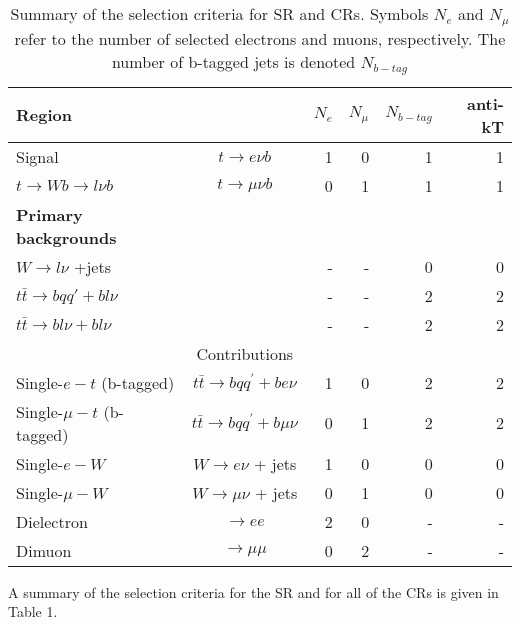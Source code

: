 \begin{table}[h!]
  \begin{center}
    \label{tab:table1}
    \begin{tabular}{lcrrrr} %
      \textbf{Region} & & \textbf{$N_{e}$}&\textbf{$N_{\mu}$}&\textbf{$N_{b-tag}$} & anti-kT\\ \hline
           Signal & $t \rightarrow e\nu b$ & 1 & 0 & 1 & 1\\
           $t \rightarrow Wb \rightarrow {l}\nu b$ & $t \rightarrow \mu \nu b$  & 0 & 1 & 1 & 1\\
 \hline
     \textbf{Primary backgrounds} &  &  &  &  &\\ \hline 
                 $W \rightarrow {l}\nu$ +jets & & - & - & 0 & 0\\ 
                 $t\bar{t} \rightarrow {b}qq'+b{l}\nu $ & & - & - & 2 &2 \\ 
                 $t\bar{t} \rightarrow b{l}\nu+b{l}\nu $ & & - & - & 2 &2 \\ \hline
               & Contributions &  &  &  &\\ \hline
        Single-$e-t$ (b-tagged)&  $ t\bar{t}\rightarrow bqq^{'}+be\nu$ & 1 & 0 & 2 & 2\\
        Single-$\mu-t$ (b-tagged)&  $ t\bar{t}\rightarrow bqq^{'}+b\mu\nu$ & 0 & 1 & 2 & 2\\

         Single-$e-W$ & $W \rightarrow e\nu$ + jets & 1 & 0 & 0 & 0\\
        Single-$\mu-W$ & $W \rightarrow \mu\nu$ + jets & 0 & 1 & 0 & 0\\
        Dielectron&  $ \rightarrow ee$ & 2 & 0 & - & -\\
        Dimuon&  $ \rightarrow \mu \mu$ & 0 & 2 & - & -\\ \hline

    \end{tabular}
  \end{center}
  \caption{Summary of the selection criteria for SR and CRs. Symbols \textbf{$N_{e}$} and \textbf{$N_{\mu}$} refer to the number of selected electrons and muons, respectively. The number of b-tagged jets is denoted \textbf{$N_{b-tag}$}}
\end{table}

A summary of the selection criteria for the SR and for all of the CRs is given in Table 1. 

\clearpage
